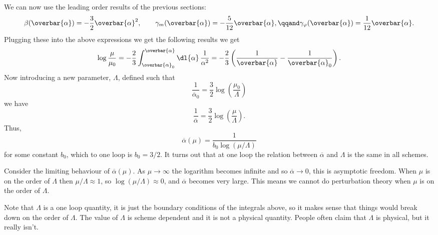 \documentclass[fleqn]{NotesClass}
\begin{document}
    We can now use the leading order results of the previous sections:
    \begin{equation}
        \beta(\overbar{\alpha}) = -\frac{3}{2}\overbar{\alpha}^2, \qquad \gamma_m(\overbar{\alpha}) = -\frac{5}{12}\overbar{\alpha}, \qqand \gamma_\varphi(\overbar{\alpha}) = \frac{1}{12}\overbar{\alpha}.
    \end{equation}
    Plugging these into the above expressions we get the following results we get
    \begin{equation}
        \log\frac{\mu}{\mu_0} = -\frac{2}{3} \int_{\overbar{\alpha}_0}^{\overbar{\alpha}} \dl{\alpha} \, \frac{1}{\alpha^2} =  -\frac{2}{3} \left( \frac{1}{\overbar{\alpha}} - \frac{1}{\overbar{\alpha}_0} \right).
    \end{equation}
    Now introducing a new parameter, \(\Lambda\), defined such that
    \begin{equation}
        \frac{1}{\overbar{\alpha}_0} = \frac{3}{2} \log\left( \frac{\mu_0}{\Lambda} \right)
    \end{equation}
    we have
    \begin{equation}
        \frac{1}{\overbar{\alpha}} = \frac{3}{2}\log\left( \frac{\mu}{\Lambda} \right).
    \end{equation}
    Thus,
    \begin{equation}
        \overbar{\alpha}(\mu) = \frac{1}{b_0 \log(\mu/\Lambda)}
    \end{equation}
    for some constant \(b_0\), which to one loop is \(b_0 = 3/2\).
    It turns out that at one loop the relation between \(\overbar{\alpha}\) and \(\Lambda\) is the same in all schemes.
    
    Consider the limiting behaviour of \(\overbar{\alpha}(\mu)\).
    As \(\mu \to \infty\) the logarithm becomes infinite and so \(\overbar{\alpha} \to 0\), this is asymptotic freedom.
    When \(\mu\) is on the order of \(\Lambda\) then \(\mu/\Lambda \approx 1\), so \(\log(\mu/\Lambda) \approx 0\), and \(\overbar{\alpha}\) becomes very large.
    This means we cannot do perturbation theory when \(\mu\) is on the order of \(\Lambda\).
    
    Note that \(\Lambda\) is a one loop quantity, it is just the boundary conditions of the integrals above, so it makes sense that things would break down on the order of \(\Lambda\).
    The value of \(\Lambda\) is scheme dependent and it is not a physical quantity.
    People often claim that \(\Lambda\) is physical, but it really isn't.
    
\end{document}
